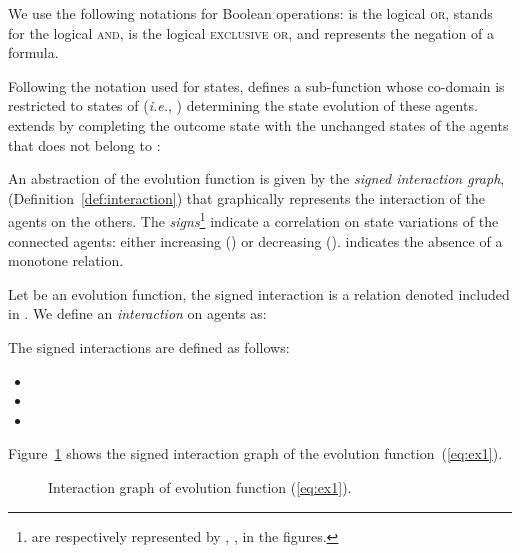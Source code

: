 \documentclass[12pt]{elsarticle}
\newcommand{\abbrev}[1]{#1, \relax}
\newcommand{\ie}[0]{\abbrev{\textit{i.e.}}}
\begin{document}
We use the following notations for Boolean operations:  is the logical \textsc{or},  stands for the logical \textsc{and},  is the logical \textsc{exclusive or}, and  represents the negation of a formula.

Following the notation used for states,  defines a sub-function whose co-domain is restricted to states of  (\ie ) determining the state evolution of these agents.  extends  by completing the outcome state with the unchanged states of the agents that does not belong to :
 

An abstraction of the evolution function  is given by the \emph{signed interaction graph},  (Definition~\ref{def:interaction}) that graphically represents the interaction of the agents on the others. The \emph{signs}\footnote{ are respectively represented by , ,  in the figures.}  indicate a correlation on state variations of the connected agents: either increasing () or decreasing ().  indicates the absence of a monotone relation.

\begin{definition}
\label{def:interaction}
Let  be an evolution function, the signed interaction is a relation denoted included in . We define an \emph{interaction} on agents as: 

The signed interactions are defined as follows: 
\begin{itemize}
\item  
\item  
\item  
\end{itemize}
\end{definition}
Figure~\ref{fig:inet-ex1} shows the signed interaction graph of the evolution function~(\ref{eq:ex1}). 

\begin{figure}[ht]
\begin{center}
\end{center}
\caption{Interaction graph of evolution function (\ref{eq:ex1}). }
\label{fig:inet-ex1}
\end{figure}
\end{document}
